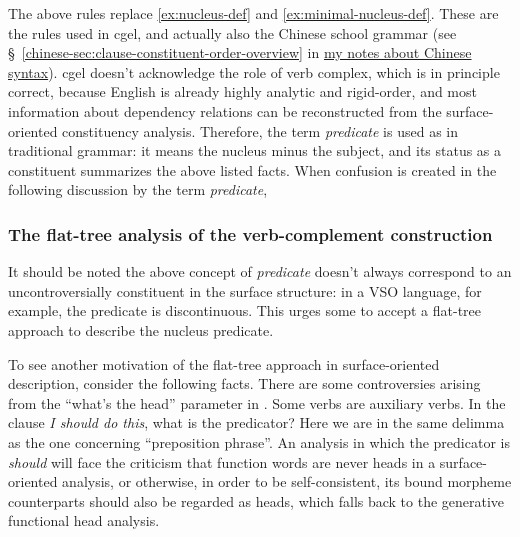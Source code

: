 \documentclass[UTF8, a4paper, oneside, scheme=plain]{ctexart}
\newcommand*{\citesec}[1]{\S~{#1}}
\newcommand*{\term}[1]{\emph{#1}}
\newcommand*{\corpus}[1]{\emph{#1}}
\newcommand{\chinesenote}{\href{../Chinese/main.pdf}{my notes about Chinese syntax}}
\begin{document}
The above rules replace \eqref{ex:nucleus-def} and \eqref{ex:minimal-nucleus-def}.
These are the rules used in \ac{cgel}, and actually also the Chinese school grammar
(see \citesec{\ref{chinese-sec:clause-constituent-order-overview}} in \chinesenote).
\ac{cgel} doesn't acknowledge the role of verb complex,
which is in principle correct, 
because English is already highly analytic and rigid-order,
and most information about dependency relations can be reconstructed 
from the surface-oriented constituency analysis.
Therefore, the term \term{predicate} is used as in traditional grammar:
it means the nucleus minus the subject, 
and its status as a constituent summarizes the above listed facts.
When confusion is created in the following discussion by the term \term{predicate},


\subsubsection{The flat-tree analysis of the verb-complement construction}

It should be noted the above concept of \term{predicate} doesn't always correspond to 
an uncontroversially constituent in the surface structure:
in a VSO language, for example, the predicate is discontinuous.
This urges some to accept a flat-tree approach to describe the nucleus predicate.

To see another motivation of the flat-tree approach in surface-oriented description, consider the following facts.
There are some controversies arising from the ``what's the head'' parameter in .
Some verbs are auxiliary verbs.
In the clause \corpus{I should do this},
what is the predicator?
Here we are in the same delimma as the one concerning ``preposition phrase''.
An analysis in which the predicator is \corpus{should} will face the criticism 
that function words are never heads in a surface-oriented analysis,
or otherwise, in order to be self-consistent,
its bound morpheme counterparts should also be regarded as heads,
which falls back to the generative functional head analysis.
\end{document}
